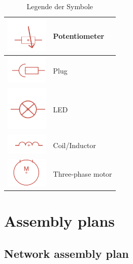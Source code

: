 \begin{table}[h!]
{\begin{tabular}{|m{5cm}|m{7cm}|}
			\hline
			\centering\includegraphics[width=2cm]{Legende/Potentiometer.png} & \centering Potentiometer \tabularnewline
			\hline
			\centering\includegraphics[width=2cm]{Legende/Stecker.png} & \centering Plug \tabularnewline
			\hline
			\centering\includegraphics[width=2cm]{Legende/LED.png} & \centering LED \tabularnewline
			\hline
			\centering\includegraphics[width=2cm]{Legende/Spule.png} & \centering Coil/Inductor \tabularnewline
			\hline
			\centering\includegraphics[width=2cm]{Legende/3 Phasen Motor.png} & \centering Three-phase motor \tabularnewline
			\hline
	\end{tabular}}
	\caption{Legende der Symbole}
	\label{tab:legende}
\end{table}
\newpage
\section{Assembly plans}

\subsection{Network assembly plan}


